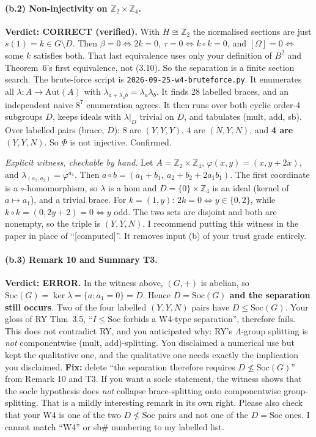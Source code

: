 \documentclass[11pt]{article}
\newcommand{\Soc}{\mathrm{Soc}}
\newcommand{\verdict}[1]{\textbf{Verdict: #1.}}
\begin{document}
\paragraph{(b.2) Non-injectivity on $\mathbb Z_2\times\mathbb Z_4$.} \verdict{CORRECT (verified)} With $H\cong\mathbb Z_2$
the normalised sections are just $s(1)=k\in G\setminus D$. Then $\beta=0\iff 2k=0$, $\tau=0\iff k\circ k=0$, and
$[\Omega]=0\iff$ some $k$ satisfies both. That last equivalence uses only your definition of $B^2$ and Theorem~6's
first equivalence, not (3.10). So the separation is a finite section search. The brute-force script is
\texttt{2026-09-25-w4-bruteforce.py}. It enumerates all $\lambda:A\to\mathrm{Aut}(A)$ with
$\lambda_{a+\lambda_a b}=\lambda_a\lambda_b$. It finds 28 labelled braces, and an independent naive
$8^7$ enumeration agrees. It then runs over both cyclic order-4 subgroups $D$, keeps ideals with
$\lambda|_D$ trivial on $D$, and tabulates (mult, add, sb).
Over labelled pairs (brace, $D$): 8 are $(Y,Y,Y)$, 4 are $(N,Y,N)$, and \textbf{4 are $(Y,Y,N)$}. So $\Phi$ is not
injective. Confirmed.

\emph{Explicit witness, checkable by hand.} Let $A=\mathbb Z_2\times\mathbb Z_4$, $\varphi(x,y)=(x,y+2x)$, and
$\lambda_{(a_1,a_2)}=\varphi^{a_1}$. Then $a\circ b=(a_1+b_1,\ a_2+b_2+2a_1b_1)$. The first coordinate is a
$\circ$-homomorphism, so $\lambda$ is a hom and $D=\{0\}\times\mathbb Z_4$ is an ideal (kernel of $a\mapsto a_1$),
and a trivial brace. For $k=(1,y)$: $2k=0\iff y\in\{0,2\}$, while $k\circ k=(0,2y+2)=0\iff y$ odd. The two sets
are disjoint and both are nonempty, so the triple is $(Y,Y,N)$. I recommend putting this witness in the paper in place of
``[computed]''. It removes input (b) of your trust grade entirely.

\paragraph{(b.3) Remark 10 and Summary T3.} \verdict{ERROR} In the witness above, $(G,+)$ is abelian, so
$\Soc(G)=\ker\lambda=\{a:a_1=0\}=D$. Hence \textbf{$D=\Soc(G)$ and the separation still occurs}. Two of the four
labelled $(Y,Y,N)$ pairs have $D\le\Soc(G)$. Your gloss of RY Thm~3.5, ``$I\le\Soc$ forbids a W4-type
separation'', therefore fails. This does not contradict RY, and you anticipated why: RY's $\Lambda$-group splitting is
\emph{not} componentwise (mult, add)-splitting. You disclaimed a numerical use but kept the qualitative one, and
the qualitative one needs exactly the implication you disclaimed. \textbf{Fix:} delete ``the separation therefore requires
$D\not\le\Soc(G)$'' from Remark 10 and T3. If you want a socle statement, the witness shows that the socle
hypothesis does \emph{not} collapse brace-splitting onto componentwise group-splitting. That is a mildly
interesting remark in its own right. Please also check that your W4 is one of the two $D\not\le\Soc$ pairs and not
one of the $D=\Soc$ ones. I cannot match ``W4'' or sb\# numbering to my labelled list.
\end{document}
